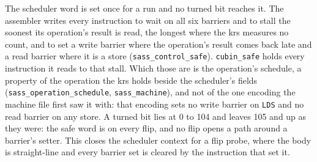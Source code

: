 The scheduler word is set once for a run and no turned bit reaches it. The assembler writes every instruction to wait on all six barriers and to stall the soonest its operation's result is read, the longest where the krs measures no count, and to set a write barrier where the operation's result comes back late and a read barrier where it is a store (\texttt{sass\_\allowbreak{}control\_\allowbreak{}safe}). \texttt{cubin\_\allowbreak{}safe} holds every instruction it reads to that stall. Which those are is the operation's schedule, a property of the operation the krs holds beside the scheduler's fields (\texttt{sass\_\allowbreak{}operation\_\allowbreak{}schedule}, \texttt{sass\_\allowbreak{}machine}), and not of the one encoding the machine file first saw it with: that encoding sets no write barrier on \texttt{LDS} and no read barrier on any store. A turned bit lies at 0 to 104 and leaves 105 and up as they were: the safe word is on every flip, and no flip opens a path around a barrier's setter. This closes the scheduler context for a flip probe, where the body is straight-line and every barrier set is cleared by the instruction that set it.


